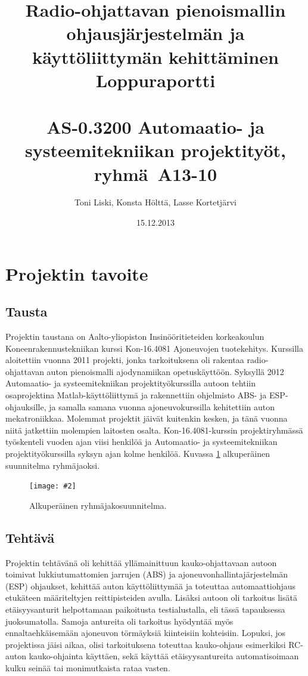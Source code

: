 \documentclass{article}
\newcommand{\kuvaa}[4]{%
	\begin{figure}[h]%
		\centering \texttt{[image: \#2]}%
		\caption{#3 \label{fig:#4}}%
	\end{figure}%
}
\begin{document}


\title{
Radio-ohjattavan pienoismallin ohjausjärjestelmän ja käyttöliittymän kehittäminen \\
Loppuraportti \\
~\\
AS-0.3200 Automaatio- ja systeemitekniikan projektityöt, ryhmä~A13-10
}

\author{Toni Liski, Konsta Hölttä, Lasse Kortetjärvi}
\date{15.12.2013}

\maketitle
\thispagestyle{empty}
\clearpage

\tableofcontents
\clearpage

\section{Projektin tavoite}

\subsection{Tausta}
Projektin taustana on Aalto-yliopiston Insinööritieteiden korkeakoulun Koneenrakennustekniikan kurssi Kon-16.4081 Ajoneuvojen tuotekehitys. Kurssilla aloitettiin vuonna 2011 projekti, jonka tarkoituksena oli rakentaa radio-ohjattavan auton pienoismalli ajodynamiikan opetuskäyttöön. Syksyllä 2012 Automaatio- ja systeemitekniikan projektityökurssilla autoon tehtiin osaprojektina Matlab-käyttöliittymä ja rakennettiin ohjelmisto ABS- ja ESP-ohjauksille, ja samalla samana vuonna ajoneuvokurssilla kehitettiin auton mekatroniikkaa. Molemmat projektit jäivät kuitenkin kesken, ja tänä vuonna niitä jatkettiin molempien laitosten osalta. Kon-16.4081-kurssin projektiryhmässä työskenteli vuoden ajan viisi henkilöä ja Automaatio- ja systeemitekniikan projektityökurssilla syksyn ajan kolme henkilöä. Kuvassa \ref{fig:ryhmajako} alkuperäinen suunnitelma ryhmäjaoksi.

\kuvaa{0.8}{ryhmajako}{Alkuperäinen ryhmäjakosuunnitelma.}{ryhmajako}

\subsection{Tehtävä}
Projektin tehtävänä oli kehittää yllämainittuun kauko-ohjattavaan autoon toimivat lukkiutumattomien jarrujen (ABS) ja ajoneuvonhallintajärjestelmän (ESP) ohjaukset, kehittää auton käyttöliittymää ja toteuttaa automaattiohjaus etukäteen määriteltyjen reittipisteiden avulla. Lisäksi autoon oli tarkoitus lisätä etäisyysanturit helpottamaan paikoitusta testialustalla, eli tässä tapauksessa juoksumatolla. Samoja antureita oli tarkoitus hyödyntää myös ennaltaehkäisemään ajoneuvon törmäyksiä kiinteisiin kohteisiin. Lopuksi, jos projektissa jäisi aikaa, olisi tarkoituksena toteuttaa kauko-ohjaus esimerkiksi RC-auton kauko-ohjainta käyttäen, sekä käyttää etäisyysantureita automatisoimaan kulku seinää tai monimutkaista rataa vasten.
\end{document}
